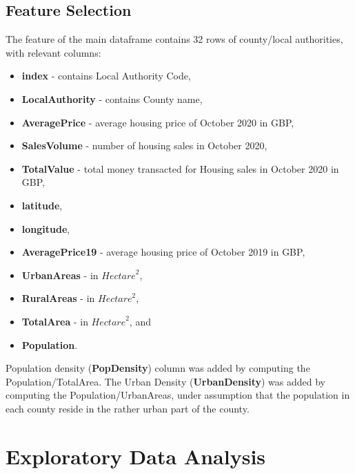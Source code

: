\documentclass{homeworg}
\begin{document}
\subsection{Feature Selection}
The feature of the main dataframe contains 32 rows of county/local authorities, with relevant columns:
\begin{itemize}
    \item \textbf{index} - contains Local Authority Code,
    \item \textbf{LocalAuthority} - contains County name,
    \item \textbf{AveragePrice} - average housing price of October 2020 in GBP,
    \item \textbf{SalesVolume} - number of housing sales in October 2020,
    \item \textbf{TotalValue} - total money transacted for Housing sales in October 2020 in GBP,
    \item \textbf{latitude},
    \item \textbf{longitude},
    \item \textbf{AveragePrice19} - average housing price of October 2019 in GBP,
    \item \textbf{UrbanAreas} - in ${Hectare}^2$,
    \item \textbf{RuralAreas} - in ${Hectare}^2$,
    \item \textbf{TotalArea} - in ${Hectare}^2$, and
    \item \textbf{Population}.
\end{itemize}
Population density (\textbf{PopDensity}) column was added by computing the Population/TotalArea. The Urban Density (\textbf{UrbanDensity}) was added by computing the Population/UrbanAreas, under assumption that the population in each county reside in the rather urban part of the county. 
\section{Exploratory Data Analysis}
\end{document}
